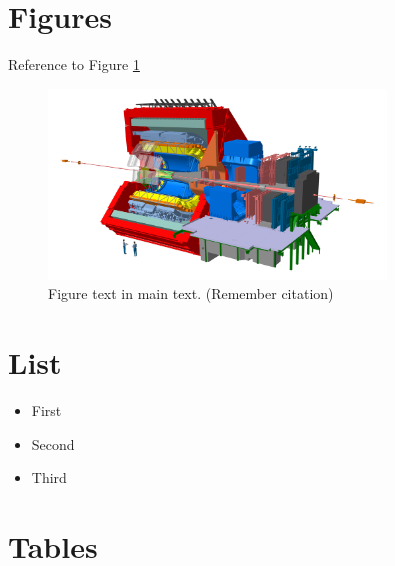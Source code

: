 \lipsum[2]


\section{Figures}
\label{sec:figures}

Reference to Figure \ref{fig:alice-detector}

\begin{figure}[ht]
    \centering
    \includegraphics[width=0.8\textwidth]{Master/figs/alice_detectors.jpg}
    \caption[Figure text in list of figs]{Figure text in main text. (Remember citation)}
    \label{fig:alice-detector}
\end{figure}

\section{List}
\label{sec:list}

\begin{itemize}
    \item First
    \item Second
    \item Third
\end{itemize}

\section{Tables}
\label{sec:table}

